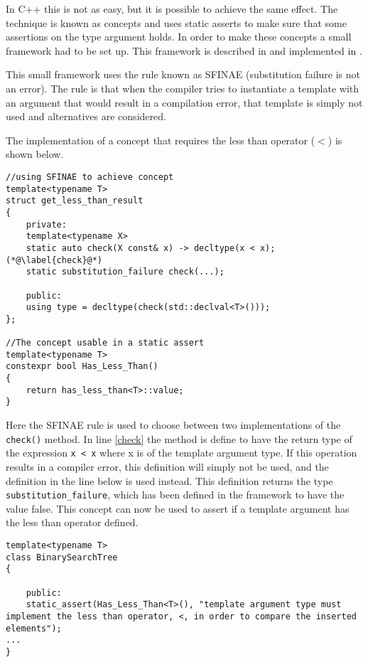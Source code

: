 In C++ this is not as easy, but it is possible to achieve the same effect.
The technique is known as concepts and uses static asserts to make sure that some assertions on the type argument holds. \cite[p.~708]{stroustrup2013c++}
In order to make these concepts a small framework had to be set up. 
This framework is described in \citet[p.~800]{stroustrup2013c++} and implemented in .

This small framework uses the rule known as SFINAE (substitution failure is not an error).
The rule is that when the compiler tries to instantiate a template with an argument that would result in a compilation error, that template is simply not used and alternatives are considered\cite[p.~692]{stroustrup2013c++}.

The implementation of a concept that requires the less than operator ($ < $) is shown below.

\begin{lstlisting}
//using SFINAE to achieve concept
template<typename T>
struct get_less_than_result
{
	private:
	template<typename X>
	static auto check(X const& x) -> decltype(x < x); (*@\label{check}@*)
	static substitution_failure check(...);

	public:
	using type = decltype(check(std::declval<T>()));
};

//The concept usable in a static assert
template<typename T>
constexpr bool Has_Less_Than()
{
	return has_less_than<T>::value;
}
\end{lstlisting}

Here the SFINAE rule is used to choose between two implementations of the \lstinline|check()| method.
In line \ref{check} the method is define to have the return type of the expression \lstinline|x < x| where x is of the template argument type.
If this operation results in a compiler error, this definition will simply not be used, and the definition in the line below is used instead.
This definition returns the type \lstinline|substitution_failure|, which has been defined in the framework to have the value false.
This concept can now be used to assert if a template argument has the less than operator defined.

\begin{lstlisting}
template<typename T>
class BinarySearchTree
{

	public:
	static_assert(Has_Less_Than<T>(), "template argument type must implement the less than operator, <, in order to compare the inserted elements");
...
}
\end{lstlisting}

